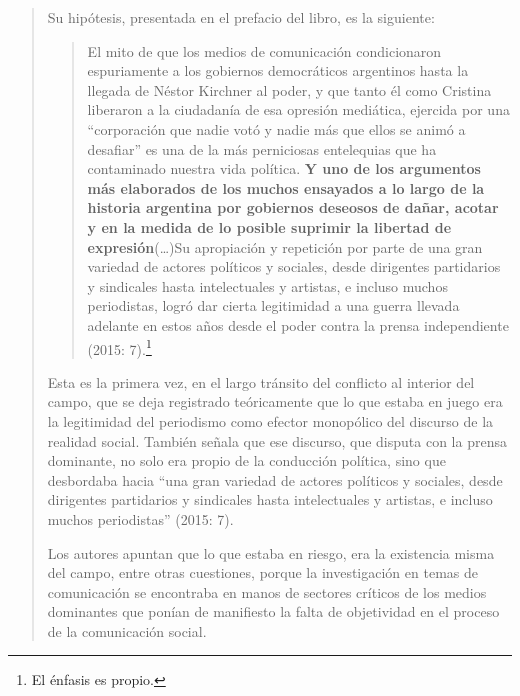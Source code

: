 \begin{quote}
Su hipótesis, presentada en el prefacio del libro, es la siguiente:

\begin{quote}
	El mito de que los medios de comunicación condicionaron espuriamente a los gobiernos democráticos argentinos hasta la llegada de Néstor Kirchner al poder, y que tanto él como Cristina liberaron a la ciudadanía de esa opresión mediática, ejercida por una \enquote{corporación que nadie votó y nadie más que ellos se animó a desafiar} es una de la más perniciosas entelequias que ha contaminado nuestra vida política. \textbf{Y uno de los argumentos más elaborados de los muchos ensayados a lo largo de la historia argentina por gobiernos deseosos de dañar, acotar y en la medida de lo posible suprimir la libertad de expresión}(\dots)Su apropiación y repetición por parte de una gran variedad de actores políticos y sociales, desde dirigentes partidarios y sindicales hasta intelectuales y artistas, e incluso muchos periodistas, logró dar cierta legitimidad a una guerra llevada adelante en estos años desde el poder contra la prensa independiente (2015: 7).\footnote{El énfasis es propio.}
\end{quote}


Esta es la primera vez, en el largo tránsito del conflicto al interior del campo, que se deja registrado teóricamente que lo que estaba en juego era la legitimidad del periodismo como efector monopólico del discurso de la realidad social. También señala que ese discurso, que disputa con la prensa dominante, no solo era propio de la conducción política, sino que desbordaba hacia \enquote{una gran variedad de actores políticos y sociales, desde dirigentes partidarios y sindicales hasta intelectuales y artistas, e incluso muchos periodistas} (2015: 7).

Los autores apuntan que lo que estaba en riesgo, era la existencia misma del campo, entre otras cuestiones, porque la investigación en temas de comunicación se encontraba en manos de sectores críticos de los medios dominantes que ponían de manifiesto la falta de objetividad en el proceso de la comunicación social.


\end{quote}
